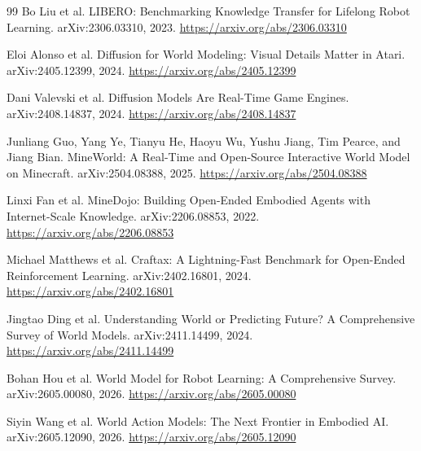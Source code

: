 \documentclass[11pt,a4paper]{ctexart}
\begin{document}
\begin{thebibliography}{99}
Bo Liu et al.
\newblock LIBERO: Benchmarking Knowledge Transfer for Lifelong Robot Learning.
\newblock arXiv:2306.03310, 2023.
\newblock \url{https://arxiv.org/abs/2306.03310}

Eloi Alonso et al.
\newblock Diffusion for World Modeling: Visual Details Matter in Atari.
\newblock arXiv:2405.12399, 2024.
\newblock \url{https://arxiv.org/abs/2405.12399}

Dani Valevski et al.
\newblock Diffusion Models Are Real-Time Game Engines.
\newblock arXiv:2408.14837, 2024.
\newblock \url{https://arxiv.org/abs/2408.14837}

Junliang Guo, Yang Ye, Tianyu He, Haoyu Wu, Yushu Jiang, Tim Pearce, and Jiang Bian.
\newblock MineWorld: A Real-Time and Open-Source Interactive World Model on Minecraft.
\newblock arXiv:2504.08388, 2025.
\newblock \url{https://arxiv.org/abs/2504.08388}

Linxi Fan et al.
\newblock MineDojo: Building Open-Ended Embodied Agents with Internet-Scale Knowledge.
\newblock arXiv:2206.08853, 2022.
\newblock \url{https://arxiv.org/abs/2206.08853}

Michael Matthews et al.
\newblock Craftax: A Lightning-Fast Benchmark for Open-Ended Reinforcement Learning.
\newblock arXiv:2402.16801, 2024.
\newblock \url{https://arxiv.org/abs/2402.16801}

Jingtao Ding et al.
\newblock Understanding World or Predicting Future? A Comprehensive Survey of World Models.
\newblock arXiv:2411.14499, 2024.
\newblock \url{https://arxiv.org/abs/2411.14499}

Bohan Hou et al.
\newblock World Model for Robot Learning: A Comprehensive Survey.
\newblock arXiv:2605.00080, 2026.
\newblock \url{https://arxiv.org/abs/2605.00080}

Siyin Wang et al.
\newblock World Action Models: The Next Frontier in Embodied AI.
\newblock arXiv:2605.12090, 2026.
\newblock \url{https://arxiv.org/abs/2605.12090}

\end{thebibliography}
\end{document}
